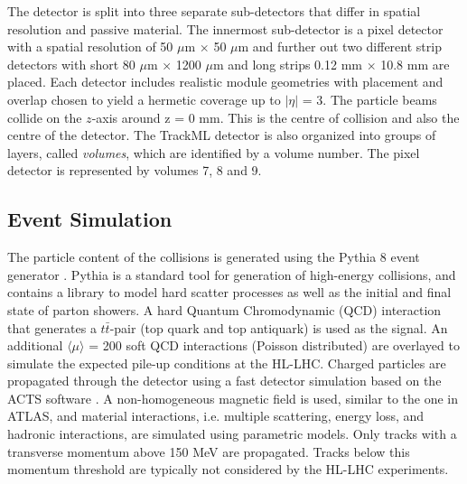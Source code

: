 The detector is split into three separate sub-detectors that differ in spatial resolution and passive material. The innermost sub-detector is a pixel detector with a spatial resolution of 50 $\mu$m $\times$ 50 $\mu$m and further out two different strip detectors with short 80 $\mu$m × 1200 $\mu$m and long strips 0.12 mm $\times$ 10.8 mm are placed. Each detector includes realistic module geometries with placement and overlap chosen to yield a hermetic coverage up to $\lvert \eta \rvert$ = 3. The particle beams collide on the $z$-axis around z = 0 mm. This is the centre of collision and also the centre of the detector. The TrackML detector is also organized into groups of layers, called \textit{volumes}, which are identified by a volume number. The pixel detector is represented by volumes 7, 8 and 9.






\subsection{Event Simulation}
\label{trackml-simulation}
The particle content of the collisions is generated using the Pythia 8 event generator \cite{pythia-8}. Pythia is a standard tool for generation of high-energy collisions, and contains a library to model hard scatter processes as well as the initial and final state of parton showers. A hard Quantum Chromodynamic (QCD) interaction that generates a $t\bar{t}$-pair (top quark and top antiquark) is used as the signal. An additional $\langle \mu \rangle$ = 200 soft QCD interactions (Poisson distributed) are overlayed to simulate the expected pile-up conditions at the HL-LHC. Charged particles are propagated through the detector using a fast detector simulation based on the ACTS software \cite{Gumpert_2017}. A non-homogeneous magnetic field is used, similar to the one in ATLAS, and material interactions, i.e. multiple scattering, energy loss, and hadronic interactions, are simulated using parametric models. Only tracks with a transverse momentum above 150 MeV are propagated. Tracks below this momentum threshold are typically not considered by the HL-LHC experiments.

